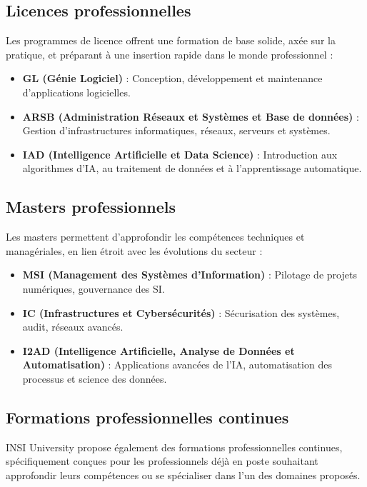\documentclass[a4paper,12pt]{book}
\begin{document}
\subsection{Licences professionnelles}

Les programmes de licence offrent une formation de base solide, axée sur la pratique, et préparant à une insertion rapide dans le monde professionnel :

\begin{itemize}
    \item \textbf{GL (Génie Logiciel)} : Conception, développement et maintenance d'applications logicielles.
    \item \textbf{ARSB (Administration Réseaux et Systèmes et Base de données)} : Gestion d’infrastructures informatiques, réseaux, serveurs et systèmes.
    \item \textbf{IAD (Intelligence Artificielle et Data Science)} : Introduction aux algorithmes d’IA, au traitement de données et à l’apprentissage automatique.
\end{itemize}

\subsection{Masters professionnels}

Les masters permettent d’approfondir les compétences techniques et managériales, en lien étroit avec les évolutions du secteur :

\begin{itemize}
    \item \textbf{MSI (Management des Systèmes d’Information)} : Pilotage de projets numériques, gouvernance des SI.
    \item \textbf{IC (Infrastructures et Cybersécurités)} : Sécurisation des systèmes, audit, réseaux avancés.
    \item \textbf{I2AD (Intelligence Artificielle, Analyse de Données et Automatisation)} : Applications avancées de l’IA, automatisation des processus et science des données.
\end{itemize}

\subsection{Formations professionnelles continues}

INSI University propose également des formations professionnelles continues, spécifiquement conçues pour les professionnels déjà en poste souhaitant approfondir leurs compétences ou se spécialiser dans l’un des domaines proposés.
\end{document}
